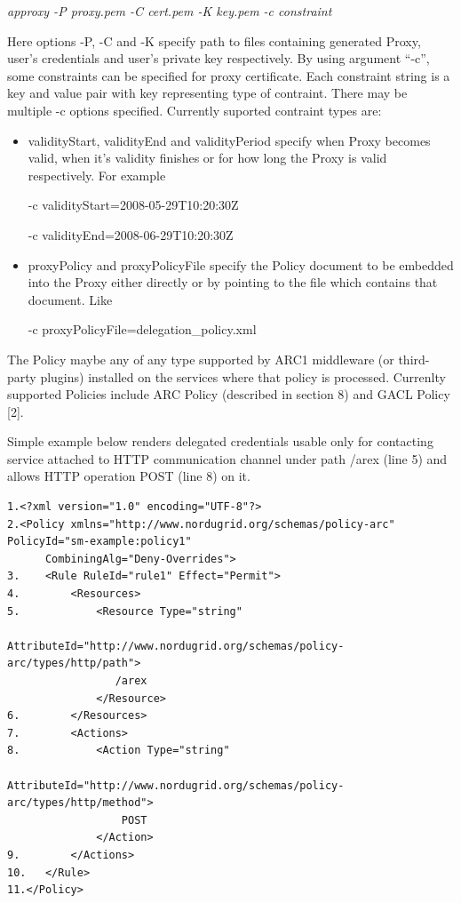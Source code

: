 \documentclass{article}                            %
\begin{document}
\emph{approxy -P proxy.pem -C cert.pem -K key.pem -c constraint}

Here options -P, -C and -K specify path to files containing generated Proxy, user's credentials and user's private key respectively. By using argument ``-c'', some constraints can be specified for proxy certificate. Each constraint string is a key and value pair with key representing type of contraint. There may be multiple -c options specified.  Currently suported contraint types are:

    \begin{itemize}
        \item validityStart, validityEnd and validityPeriod  specify when Proxy becomes valid, when it's validity finishes or for how long the Proxy is valid respectively. For example 

-c validityStart=2008-05-29T10:20:30Z

-c validityEnd=2008-06-29T10:20:30Z

        \item proxyPolicy and proxyPolicyFile specify the Policy document to be embedded into the Proxy either directly or by pointing to the file which contains that document. Like 

-c proxyPolicyFile=delegation\_policy.xml
    \end{itemize}

The Policy maybe any of any type supported by ARC1 middleware (or third-party plugins) installed on the services where that policy is processed. Currenlty supported Policies include ARC Policy (described in section 8) and GACL Policy [2].

Simple example below renders delegated credentials usable only for contacting service attached to HTTP communication channel under path /arex (line 5)  and allows HTTP operation POST (line 8) on it. 

\begin{verbatim}
1.<?xml version="1.0" encoding="UTF-8"?>
2.<Policy xmlns="http://www.nordugrid.org/schemas/policy-arc" PolicyId="sm-example:policy1" 
      CombiningAlg="Deny-Overrides">
3.    <Rule RuleId="rule1" Effect="Permit">
4.        <Resources>
5.            <Resource Type="string" 
                  AttributeId="http://www.nordugrid.org/schemas/policy-arc/types/http/path">
                 /arex
              </Resource>
6.        </Resources>
7.        <Actions>
8.            <Action Type="string" 
                  AttributeId="http://www.nordugrid.org/schemas/policy-arc/types/http/method">
                  POST
              </Action>
9.        </Actions>
10.   </Rule>
11.</Policy>
\end{verbatim}
\end{document}
